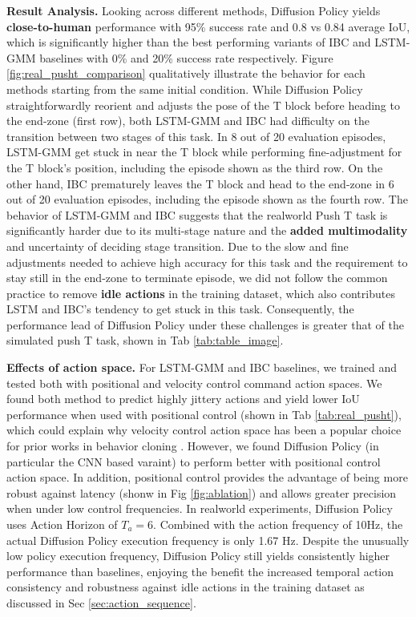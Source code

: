 \textbf{Result Analysis.} Looking across different methods, Diffusion Policy yields \textbf{close-to-human} performance with 95\%  success rate and 0.8 vs 0.84 average IoU, which is significantly higher than the best performing variants of IBC and LSTM-GMM baselines with 0\% and 20\% success rate respectively. Figure \ref{fig:real_pusht_comparison} qualitatively illustrate the behavior for each methods starting from the same initial condition.
While Diffusion Policy straightforwardly reorient and adjusts the pose of the T block before heading to the end-zone (first row), both LSTM-GMM and IBC had difficulty on the transition between two stages of this task. In 8 out of 20 evaluation episodes, LSTM-GMM get stuck in near the T block while performing fine-adjustment for the T block's position, including the episode shown as the third row. On the other hand, IBC prematurely leaves the T block and head to the end-zone in 6 out of 20 evaluation episodes, including the episode shown as the fourth row.
The behavior of LSTM-GMM and IBC suggests that the realworld Push T task is significantly harder due to its multi-stage nature and the \textbf{added multimodality} and uncertainty of deciding stage transition.
Due to the slow and fine adjustments needed to achieve high accuracy for this task and the requirement to stay still in the end-zone to terminate episode, we did not follow the common practice to remove \textbf{idle actions} in the training dataset, which also contributes LSTM and IBC's tendency to get stuck in this task.
Consequently, the performance lead of Diffusion Policy under these challenges is greater that of the simulated push T task, shown in Tab \ref{tab:table_image}.

\textbf{Effects of action space.} For LSTM-GMM and IBC baselines, we trained and tested both with positional and velocity control command action spaces. We found both method to predict highly jittery actions and yield lower IoU performance when used with positional control (shown in Tab \ref{tab:real_pusht}), which could explain why velocity control action space has been a popular choice for prior works in behavior cloning \cite{ibc,robomimic,bet}. However, we found Diffusion Policy (in particular the CNN based varaint) to perform better with positional control action space. In addition, positional control provides the advantage of being more robust against latency (shonw in Fig \ref{fig:ablation}) and allows greater precision when under low control frequencies. In realworld experiments, Diffusion Policy uses Action Horizon of $T_a=6$. Combined with the action frequency of 10Hz, the actual Diffusion Policy execution frequency is only 1.67 Hz. Despite the unusually low policy execution frequency, Diffusion Policy still yields consistently higher performance than baselines, enjoying the benefit the increased temporal action consistency and robustness against idle actions in the training dataset as discussed in Sec \ref{sec:action_sequence}.

